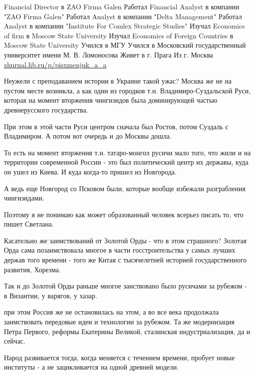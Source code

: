 \begin{itemize}
\begin{itemize}
Financial Director в ZAO Firma Galen
Работал Financial Analyst в компании "ZAO Firma Galen"
Работал Analyst в компании "Delta Management"
Работал Analyst в компании "Institute For Comlex Strategic Studies"
Изучал Economics of firm в Moscow State University
Изучал Economics of Foreign Countries в Moscow State University
Учился в МГУ
Учился в Московский государственный университет имени М. В. Ломоносова
Живет в г. Прага
Из г. Москва
\url{zhurnal.lib.ru/p/pisxmenjuk_a_a}
\par

Неужели с преподаванием истории в Украине такой ужас?
Москва же не на пустом месте возникла, а как один из городков т.н.
Владимиро-Суздальской Руси, которая на момент вторжения чингизидов была
доминирующей частью древнерусского государства.

При этом в этой части Руси центром сначала был Ростов, потом Суздаль с Владимиром. А потом вот очередь и до Москвы дошла.

То есть на момент вторжения т.н. татаро-монгол русичи мало того, что жили и на
территории современной России - это был политический центр их державы, куда он
ушел из Киева. И куда когда-то пришел из Новгорода.

А ведь еще Новгород со Псковом были, которые вообще избежали разграбления чингизидами.

Поэтому я не понимаю как может образованный человек всерьез писать то, что пишет Светлана.

Касательно же заимствований от Золотой Орды - что в этом страшного? Золотая
Орда сама позаимствовала многое в части госстроительства у самых лучших держав
того времени - того же Китая с тысячелетней историей государственного развития,
Хорезма.

Так и до Золотой Орды раньше многое заиствовано было русичами за рубежом - в Византии, у варягов, у хазар.

при этом Россия же не остановилась на этом, а во все века продолжала
заимствовать передовые идеи и технологии за рубежом. Та же модернизация Петра
Первого, реформы Екатерины Великой, сталинская индустриализация, да и сейчас.

Народ развивается тогда, когда меняется с течением времени, пробует новые
институты - а не зацикливается на одной древней модели.


\end{itemize}
\end{itemize}
